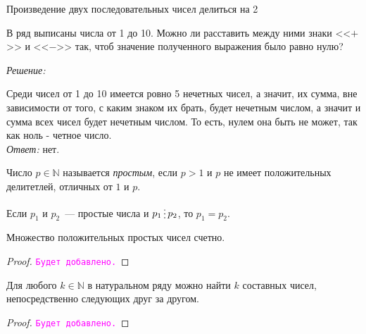 \documentclass[11pt]{article}
\begin{document}
\begin{theorem}

	 Произведение двух последовательных чисел делиться на 2\\

\end{theorem}


\begin{example}

	В ряд выписаны числа от 1 до 10. Можно ли расставить между ними знаки <<$+$>> и <<$-$>> так, чтоб значение полученного выражения было равно нулю?

\end{example}

\textit{Решение:}

Среди чисел от 1 до 10 имеется ровно 5 нечетных чисел, а значит, их сумма, вне зависимости от того, с каким знаком их брать, будет нечетным числом, а значит и сумма всех чисел будет нечетным числом. То есть, нулем она быть не может, так как ноль - четное число.\\

\textit{Ответ:} нет.

\begin{definition}
    Число $p \in \mathbb{N}$ называется \emph{простым}, если $p > 1$ и $p$ не имеет положительных делитетлей, отличных от $1$ и $p$.
\end{definition}

\begin{statement}
	Если $p_1$ и $p_2$~--- простые числа и $p_1 \divisible p_2$, то $p_1 = p_2$.
\end{statement}

\begin{theorem}[Евклид]

    Множество положительных простых чисел счетно.

\end{theorem}

\begin{proof}
	\textcolor{magenta}{\texttt{Будет добавлено.}}
\end{proof}

\begin{theorem}
	Для любого $k \in \mathbb{N}$ в натуральном ряду можно найти $k$ составных чисел, непосредственно следующих друг за другом.
\end{theorem}
\begin{proof}
	\textcolor{magenta}{\texttt{Будет добавлено.}}
\end{proof}
\end{document}
